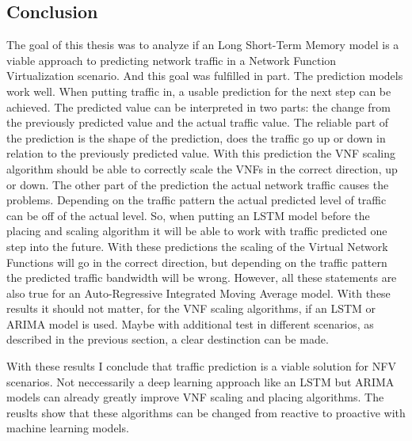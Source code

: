 \subsection{Conclusion}
The goal of this thesis was to analyze if an Long Short-Term Memory model is a viable approach to predicting network traffic in a Network Function Virtualization scenario.
And this goal was fulfilled in part.
The prediction models work well.
When putting traffic in, a usable prediction for the next step can be achieved.
The predicted value can be interpreted in two parts: the change from the previously predicted value and the actual traffic value.
The reliable part of the prediction is the shape of the prediction, does the traffic go up or down in relation to the previously predicted value.
With this prediction the VNF scaling algorithm should be able to correctly scale the VNFs in the correct direction, up or down.
The other part of the prediction the actual network traffic causes the problems.
Depending on the traffic pattern the actual predicted level of traffic can be off of the actual level.
So, when putting an LSTM model before the placing and scaling algorithm it will be able to work with traffic predicted one step into the future.
With these predictions the scaling of the Virtual Network Functions will go in the correct direction, but depending on the traffic pattern the predicted traffic bandwidth will be wrong.
However, all these statements are also true for an Auto-Regressive Integrated Moving Average model.
With these results it should not matter, for the VNF scaling algorithms, if an LSTM or ARIMA model is used.
Maybe with additional test in different scenarios, as described in the previous section, a clear destinction can be made.

With these results I conclude that traffic prediction is a viable solution for NFV scenarios.
Not neccessarily a deep learning approach like an LSTM but ARIMA models can already greatly improve VNF scaling and placing algorithms.
The reuslts show that these algorithms can be changed from reactive to proactive with machine learning models.